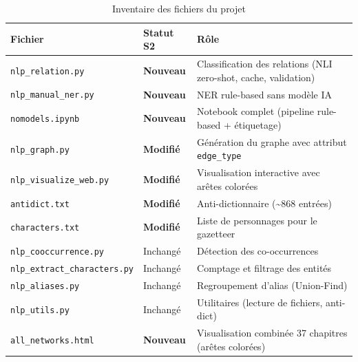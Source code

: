 \documentclass[a4paper,11pt]{article}
\begin{document}
\begin{table}[H]
  \centering
  \footnotesize
  \begin{tabularx}{\textwidth}{lp{1.6cm}X}
    \toprule
    \textbf{Fichier} & \textbf{Statut S2} & \textbf{Rôle} \\
    \midrule
    \texttt{nlp\_relation.py}           & \textbf{Nouveau}  & Classification des relations (NLI zero-shot, cache, validation) \\
    \texttt{nlp\_manual\_ner.py}        & \textbf{Nouveau}  & NER rule-based sans modèle IA \\
    \texttt{nomodels.ipynb}             & \textbf{Nouveau}  & Notebook complet (pipeline rule-based + étiquetage) \\
    \texttt{nlp\_graph.py}              & \textbf{Modifié}  & Génération du graphe avec attribut \texttt{edge\_type} \\
    \texttt{nlp\_visualize\_web.py}     & \textbf{Modifié}  & Visualisation interactive avec arêtes colorées \\
    \texttt{antidict.txt}               & \textbf{Modifié}  & Anti-dictionnaire (\textasciitilde{}868 entrées) \\
    \texttt{characters.txt}             & \textbf{Modifié}  & Liste de personnages pour le gazetteer \\
    \texttt{nlp\_cooccurrence.py}       & Inchangé          & Détection des co-occurrences \\
    \texttt{nlp\_extract\_characters.py}& Inchangé          & Comptage et filtrage des entités \\
    \texttt{nlp\_aliases.py}            & Inchangé          & Regroupement d'alias (Union-Find) \\
    \texttt{nlp\_utils.py}              & Inchangé          & Utilitaires (lecture de fichiers, anti-dict) \\
    \texttt{all\_networks.html}         & \textbf{Nouveau}  & Visualisation combinée 37 chapitres (arêtes colorées) \\
    \bottomrule
  \end{tabularx}
  \caption{Inventaire des fichiers du projet}
\end{table}
\end{document}
